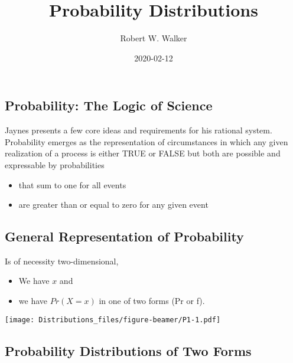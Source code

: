 \documentclass[ignorenonframetext,]{beamer}
\title{Probability Distributions}
\author{Robert W. Walker}
\date{2020-02-12}
\providecommand{\tightlist}{%
  \setlength{\itemsep}{0pt}\setlength{\parskip}{0pt}}
\begin{document}
\frame{\titlepage}

\hypertarget{probability-the-logic-of-science}{%
\subsection{Probability: The Logic of
Science}\label{probability-the-logic-of-science}}

Jaynes presents a few core ideas and requirements for his rational
system. Probability emerges as the representation of circumstances in
which any given realization of a process is either TRUE or FALSE but
both are possible and expressable by probabilities

\begin{itemize}[<+->]
\tightlist
\item
  that sum to one for all events
\item
  are greater than or equal to zero for any given event
\end{itemize}

\begin{frame}

\end{frame}

\hypertarget{general-representation-of-probability}{%
\subsection{General Representation of
Probability}\label{general-representation-of-probability}}

Is of necessity two-dimensional,

\begin{itemize}[<+->]
\tightlist
\item
  We have \(x\) and
\item
  we have \(Pr(X=x)\) in one of two forms (Pr or f).
\end{itemize}

\begin{frame}

\texttt{[image: Distributions\_files/figure-beamer/P1-1.pdf]}

\end{frame}

\begin{frame}

\end{frame}

\hypertarget{probability-distributions-of-two-forms}{%
\subsection{Probability Distributions of Two
Forms}\label{probability-distributions-of-two-forms}}
\end{document}
